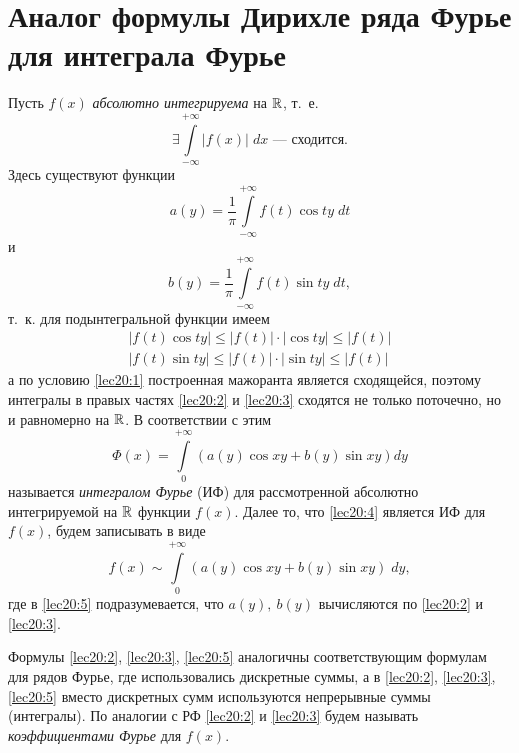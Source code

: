 \documentclass[../../main.tex]{subfiles}
\begin{document}
\section{Аналог формулы Дирихле ряда Фурье для интеграла Фурье}

Пусть $ f(x) $ \emph{абсолютно интегрируема} на $ \mathbb{R} $, т.~е.
\begin{equation}
\label{lec20:1}
\exists \int\limits_{-\infty}^{+\infty} |f(x)|\;dx \text{~--- сходится.}
\end{equation}
Здесь существуют функции
\begin{equation}
\label{lec20:2}
a(y) = \dfrac{1}{\pi} \int\limits_{-\infty}^{+\infty} 
f(t) \cos ty\;dt
\end{equation}
и
\begin{equation}
\label{lec20:3}
b(y) = \dfrac{1}{\pi} \int\limits_{-\infty}^{+\infty}
f(t) \sin ty\;dt,
\end{equation}
т.~к. для подынтегральной функции имеем
\[
\begin{gathered}
|f(t) \cos ty| \leq |f(t)|\cdot|\cos ty| \leq |f(t)|\\
|f(t) \sin ty| \leq |f(t)|\cdot|\sin ty| \leq |f(t)|
\end{gathered}
\]
а по условию \eqref{lec20:1} построенная мажоранта является сходящейся,
поэтому интегралы в правых частях \eqref{lec20:2} и \eqref{lec20:3}
сходятся не только поточечно, но и равномерно на $ \mathbb{R} $.
В соответствии с этим 
\begin{equation}
\label{lec20:4}
\Phi(x) = \int\limits_0^{+\infty} \left(
a(y) \cos xy + b(y) \sin xy
\right) dy
\end{equation}
называется \emph{интегралом Фурье} (ИФ) для рассмотренной
абсолютно интегрируемой на $ \mathbb{R} $ функции $ f(x) $.
Далее то, что \eqref{lec20:4} является ИФ для $ f(x) $, будем записывать в 
виде
\begin{equation}
\label{lec20:5}
f(x) \sim \int\limits_0^{+\infty} \left(
a(y) \cos xy + b(y) \sin xy
\right) \; dy,
\end{equation}
где в \eqref{lec20:5} подразумевается, что $ a(y),\ b(y) $ вычисляются по 
\eqref{lec20:2} и \eqref{lec20:3}.

Формулы \eqref{lec20:2}, \eqref{lec20:3}, \eqref{lec20:5} аналогичны
соответствующим формулам для рядов Фурье, где 
использовались дискретные суммы, а в 
\eqref{lec20:2}, \eqref{lec20:3}, \eqref{lec20:5}
вместо дискретных сумм используются непрерывные суммы (интегралы).
По аналогии с РФ \eqref{lec20:2} и \eqref{lec20:3} будем называть 
\emph{коэффициентами Фурье} для $ f(x) $.
\end{document}
